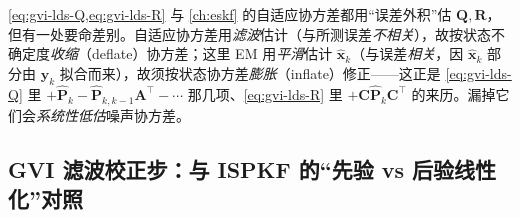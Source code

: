 \begin{insight}[系统辨识的“膨胀”修正：平滑 vs 滤波]
\cref{eq:gvi-lds-Q,eq:gvi-lds-R} 与 \cref{ch:eskf} 的自适应协方差都用“误差外积”估 $\mathbf{Q},\mathbf{R}$，但有一处要命差别。自适应协方差用\emph{滤波}估计（与所测误差\emph{不相关}），故按状态不确定度\emph{收缩}（deflate）协方差；这里 EM 用\emph{平滑}估计 $\hat{\mathbf{x}}_k$（与误差\emph{相关}，因 $\hat{\mathbf{x}}_k$ 部分由 $\mathbf{y}_k$ 拟合而来），故须按状态协方差\emph{膨胀}（inflate）修正——这正是 \cref{eq:gvi-lds-Q} 里 $+\hat{\mathbf{P}}_k-\hat{\mathbf{P}}_{k,k-1}\mathbf{A}^\top-\cdots$ 那几项、\cref{eq:gvi-lds-R} 里 $+\mathbf{C}\hat{\mathbf{P}}_k\mathbf{C}^\top$ 的来历。漏掉它们会\emph{系统性低估}噪声协方差。
\end{insight}

\subsection{GVI 滤波校正步：与 ISPKF 的“先验 vs 后验线性化”对照}
\label{sec:nlopt-gvi-filter}

